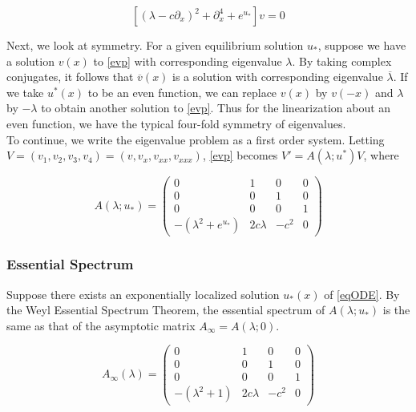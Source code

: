 \documentclass[12pt]{article}
\begin{document}
\begin{equation}\label{evp2}
[(\lambda - c \partial_x)^2 + \partial_x^4 + e^{u_*}]v = 0
\end{equation}

Next, we look at symmetry. For a given equilibrium solution $u_*$, suppose we have a solution $v(x)$ to \eqref{evp} with corresponding eigenvalue $\lambda$. By taking complex conjugates, it follows that $\overline{v}(x)$ is a solution with corresponding eigenvalue $\overline{\lambda}$. If we take $u^*(x)$ to be an even function, we can replace $v(x)$ by $v(-x)$ and $\lambda$ by $-\lambda$ to obtain another solution to \eqref{evp}. Thus for the linearization about an even function, we have the typical four-fold symmetry of eigenvalues.\\ 

To continue, we write the eigenvalue problem as a first order system. Letting $V = (v_1, v_2, v_3, v_4) = (v, v_x, v_{xx}, v_{xxx})$, \eqref{evp} becomes $V' = A(\lambda; u^*)V$, where

\begin{equation}\label{evpsystem}
A(\lambda; u_*) = \begin{pmatrix}
0 & 1 & 0 & 0 \\
0 & 0 & 1 & 0 \\
0 & 0 & 0 & 1 \\
-(\lambda^2 + e^{u_*}) & 2 c \lambda & -c^2 & 0 
\end{pmatrix}
\end{equation}

\subsubsection{Essential Spectrum}

Suppose there exists an exponentially localized solution $u_*(x)$ of \eqref{eqODE}. By the Weyl Essential Spectrum Theorem, the essential spectrum of $A(\lambda; u_*)$ is the same as that of the asymptotic matrix $A_\infty = A(\lambda; 0)$.

\begin{equation}\label{Ainf}
A_\infty(\lambda) = \begin{pmatrix}
0 & 1 & 0 & 0 \\ 
0 & 0 & 1 & 0 \\
0 & 0 & 0 & 1 \\
-(\lambda^2 + 1) & 2 c \lambda & -c^2 & 0 
\end{pmatrix}
\end{equation}
\end{document}
